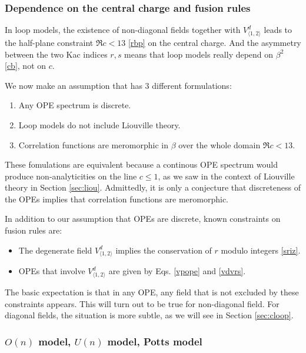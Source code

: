 \documentclass[12pt, a4paper]{article}
\theoremstyle{break}
\begin{document}
\subsubsection{Dependence on the central charge and fusion rules}

In loop models, the existence of non-diagonal fields together with $V^d_{\langle 1,2\rangle}$ leads to the half-plane constraint $\Re c<13$ \eqref{rbp} on the central charge. And the asymmetry between the two Kac indices $r,s$ means that loop models really depend on $\beta^2$ \eqref{cb}, not on $c$. 

We now make an assumption that has 3 different formulations:
\begin{enumerate}
 \item Any OPE spectrum is discrete.
 \item Loop models do not include Liouville theory. 
 \item Correlation functions are meromorphic in $\beta$ over the whole domain $\Re c<13$.
\end{enumerate}
These fomulations are equivalent because a continous OPE spectrum would produce non-analyticities on the line $c\leq 1$, as we saw in the context of Liouville theory in Section \ref{sec:liou}. Admittedly, it is only a conjecture that discreteness of the OPEs implies that correlation functions are meromorphic.

In addition to our assumption that OPEs are discrete, known constraints on fusion rules are:
\begin{itemize}
 \item The degenerate field $V^d_{\langle 1,2\rangle}$ implies the conservation of $r$ modulo integers \eqref{sriz}.
 \item OPEs that involve $V^d_{\langle 1,2\rangle}$ are given by Eqs. \eqref{vpope} and \eqref{vdvrs}.
\end{itemize}
The basic expectation is that in any OPE, any field that is not excluded by these constraints appears. This will turn out to be true for non-diagonal field. For diagonal fields, the situation is more subtle, as we will see in Section \ref{sec:cloop}.


\subsubsection{$O(n)$ model, $U(n)$ model, Potts model}\label{sec:models}
\end{document}
